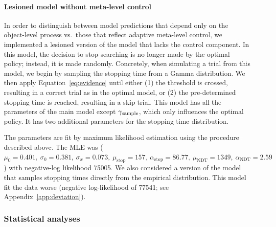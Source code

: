 \paragraph{Lesioned model without meta-level control}

In order to distinguish between model predictions that depend only on the object-level process vs.~those that reflect adaptive meta-level control, we implemented a lesioned version of the model that lacks the control component. In this model, the decision to stop searching is no longer made by the optimal policy; instead, it is made randomly. Concretely, when simulating a trial from this model, we begin by sampling the stopping time from a Gamma distribution. We then apply Equation~\ref{eq:evidence} until either (1) the threshold is crossed, resulting in a correct trial as in the optimal model, or (2) the pre-determined stopping time is reached, resulting in a skip trial. This model has all the parameters of the main model except $\gamma_\text{sample}$, which only influences the optimal policy. It has two additional parameters for the stopping time distribution.

The parameters are fit by maximum likelihood estimation using the procedure described above. The MLE was (\(
    \mu_0 = 0.401,\ 
    \sigma_0 = 0.381,\ 
    \sigma_x = 0.073,\ 
    \mu_\text{stop} = 157,\ 
    \alpha_\text{stop} = 86.77,\ 
    \mu_\text{NDT} = 1349,\ 
    \alpha_\text{NDT} = 2.59
\)) with negative-log likelihood 75005. We also considered a version of the model that samples stopping times directly from the empirical distribution. This model fit the data worse (negative log-likelihood of 77541; see Appendix~\ref{app:deviation}).


\subsubsection{Statistical analyses}

